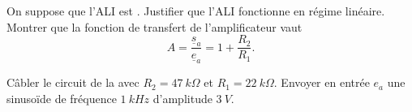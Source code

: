 \begin{protocole}
\todo On suppose que l'ALI est . Justifier que l'ALI fonctionne en régime linéaire. Montrer que la fonction de transfert de l'amplificateur vaut
\begin{equation}\label{eq:ampli_NI}
  A = \frac{\underline{s}_a}{\underline{e}_a} =1+\frac{R_2}{R_1}.
\end{equation}
\end{protocole}
 Câbler le circuit de la  avec $R_2 = \SI{47}{k\Omega}$ et $R_1 = \SI{22}{k\Omega}$. Envoyer en entrée $e_a$ une sinusoïde de fréquence $\SI{1}{kHz}$ d’amplitude $\SI{3}{V}$.
